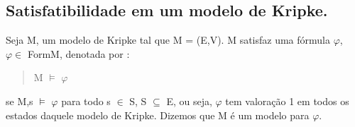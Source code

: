 \documentclass[12pt]{report}
\begin{document}
\subsection{Satisfatibilidade em um modelo de Kripke.}%
\hspace{0.5cm} Seja M, um modelo de Kripke tal que M = (E,V). M satisfaz uma fórmula $\varphi$, $\varphi \in$ FormM, denotada por :
 \begin{quote}M $\vDash$ $\varphi$ 
 \end{quote}
 se M,s $\vDash$ $\varphi$ para todo s $\in$ S, S $\subseteq$ E, ou seja, $\varphi$ tem valoração 1 em todos os estados daquele modelo de Kripke. Dizemos que M é um modelo para $\varphi$.\\
\end{document}
